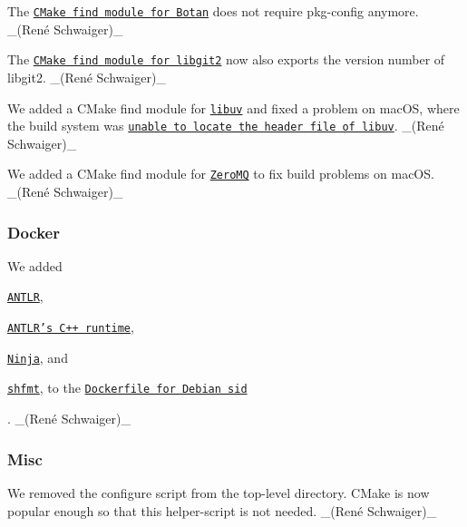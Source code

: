 \begin{DoxyItemize}
\item The \href{https://master.libelektra.org/cmake/Modules/FindLibgcrypt.cmake}{\tt C\+Make find module for Botan} does not require {\ttfamily pkg-\/config} anymore. \+\_\+(René Schwaiger)\+\_\+
\item The \href{https://master.libelektra.org/cmake/Modules/FindLibGit2.cmake}{\tt C\+Make find module for libgit2} now also exports the version number of libgit2. \+\_\+(René Schwaiger)\+\_\+
\item We added a C\+Make find module for \href{https://libuv.org}{\tt libuv} and fixed a problem on mac\+OS, where the build system was \href{https://cirrus-ci.com/task/4852008365326336}{\tt unable to locate the header file of libuv}. \+\_\+(René Schwaiger)\+\_\+
\item We added a C\+Make find module for \href{http://zeromq.org}{\tt Zero\+MQ} to fix build problems on mac\+OS. \+\_\+(René Schwaiger)\+\_\+
\end{DoxyItemize}

\subsubsection*{Docker}


\begin{DoxyItemize}
\item We added
\begin{DoxyItemize}
\item \href{https://packages.debian.org/sid/antlr4}{\tt A\+N\+T\+LR},
\item \href{https://packages.debian.org/sid/libantlr4-runtime-dev}{\tt A\+N\+T\+L\+R’s C++ runtime},
\item \href{https://packages.debian.org/sid/ninja-build}{\tt Ninja}, and
\item \href{https://github.com/mvdan/sh}{\tt {\ttfamily shfmt}}, to the \href{https://master.libelektra.org/scripts/docker/debian/sid/Dockerfile}{\tt Dockerfile for Debian sid}
\end{DoxyItemize}

. \+\_\+(René Schwaiger)\+\_\+
\end{DoxyItemize}

\subsubsection*{Misc}


\begin{DoxyItemize}
\item We removed the {\ttfamily configure} script from the top-\/level directory. C\+Make is now popular enough so that this helper-\/script is not needed. \+\_\+(René Schwaiger)\+\_\+
\end{DoxyItemize}

